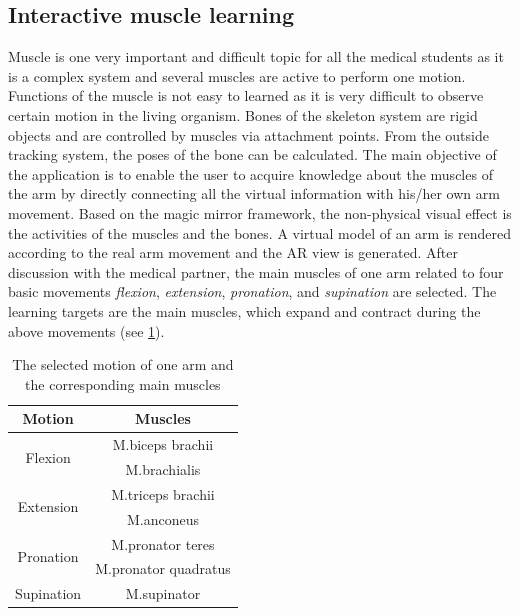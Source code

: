 \subsection{Interactive muscle learning}
Muscle is one very important and difficult topic for all the medical students as it is a complex system and several muscles are active to perform one motion.
Functions of the muscle is not easy to learned as it is very difficult to observe certain motion in the living organism.
Bones of the skeleton system are rigid objects and are controlled by muscles via attachment points. From the outside tracking system, the poses of the bone can be calculated.
The main objective of the application is to enable the user to acquire knowledge about the muscles of the arm %
by directly connecting all the virtual information with his/her own arm movement. 
Based on the magic mirror framework, the non-physical visual effect is the activities of the muscles and the bones. A virtual model of an arm is rendered according to the real arm movement and the AR view is generated.
After discussion with the medical partner, the main muscles of one arm related to four basic movements \textit{flexion}, \textit{extension}, \textit{pronation}, and \textit{supination} are selected. The learning targets are the main muscles, which expand and contract during the above movements (see \tablename{\ref{tb:3-IMR:motionMuscles}}). 
\begin{table}
	\caption[Muscles involved]{The selected motion of one arm and the corresponding main muscles}
	\centering
	\label{tb:3-IMR:motionMuscles}
	\scriptsize
	\begin{center}
		\begin{tabular}{|c|c|}
			\hline
			Motion & Muscles \\
			\hline
			\multirow{2}{*}{Flexion} & M.biceps brachii \\
			& M.brachialis \\
			\hline
			\multirow{2}{*}{Extension} & M.triceps brachii \\
			& M.anconeus \\
			\hline
			\multirow{2}{*}{Pronation} & M.pronator teres \\
			& M.pronator quadratus \\
			\hline
			Supination &M.supinator \\
			\hline
		\end{tabular}
	\end{center}
\end{table}

